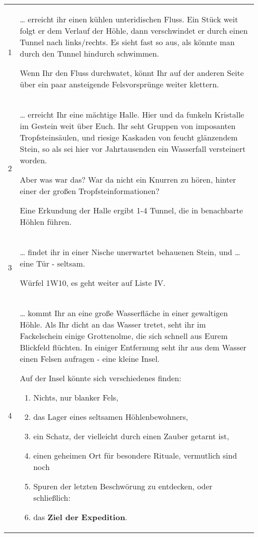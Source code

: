 \begin{tabularx}{\columnwidth}{cZ}
1 & \ldots{} erreicht ihr einen kühlen unteridischen Fluss. Ein Stück weit
  folgt er dem Verlauf der Höhle, dann verschwindet er durch einen
  Tunnel nach links/rechts. Es sieht fast so aus, als könnte man durch
  den Tunnel hindurch schwimmen.

  Wenn Ihr den Fluss durchwatet, könnt Ihr auf der anderen Seite über
  ein paar ansteigende Felsvorsprünge weiter klettern.  \\

2 & \ldots{} erreicht Ihr eine mächtige Halle. Hier und da funkeln
  Kristalle im Gestein weit über Euch. Ihr seht Gruppen von imposanten
  Tropfsteinsäulen, und riesige Kaskaden von feucht glänzendem Stein, so
  als sei hier vor Jahrtausenden ein Wasserfall versteinert worden.

  Aber was war das? War da nicht ein Knurren zu hören, hinter einer der
  großen Tropfsteinformationen?

  Eine Erkundung der Halle ergibt 1-4 Tunnel, die in benachbarte Höhlen
  führen.  \\
3 & \ldots{} findet ihr in einer Nische unerwartet behauenen Stein, und
  \ldots{} eine Tür - seltsam.

  Würfel 1W10, es geht weiter auf Liste IV.  \\

4 & \ldots{} kommt Ihr an eine große Wasserfläche in einer gewaltigen
  Höhle. Als Ihr dicht an das Wasser tretet, seht ihr im Fackelschein
  einige Grottenolme, die sich schnell aus Eurem Blickfeld flüchten. In
  einiger Entfernung seht ihr aus dem Wasser einen Felsen aufragen -
  eine kleine Insel.

  Auf der Insel könnte sich verschiedenes finden:

  \begin{enumerate}
    \item Nichts, nur blanker Fels,
    \item das Lager eines seltsamen Höhlenbewohners,
    \item ein Schatz, der vielleicht durch einen Zauber getarnt ist,
    \item einen geheimen Ort für besondere Rituale, vermutlich sind noch
    \item Spuren der letzten Beschwörung zu entdecken, oder schließlich:
    \item das \textbf{Ziel der Expedition}.
  \end{enumerate}


\end{tabularx}
